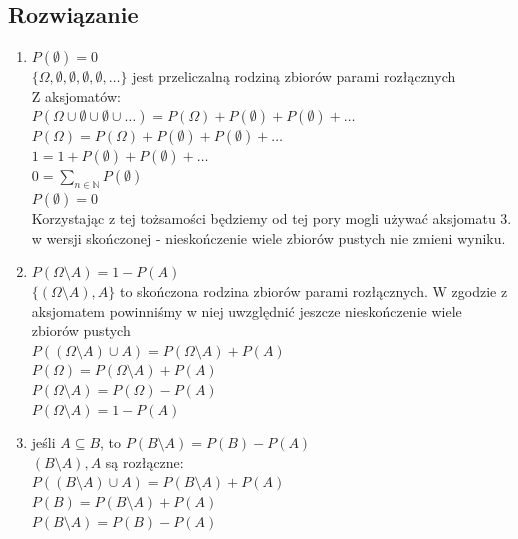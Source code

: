 \subsection*{Rozwiązanie}
\begin{enumerate}
	\item[(i)]
	      \(P(\emptyset) = 0\)\\
	      \(\{\Omega, \emptyset, \emptyset, \emptyset, \emptyset, \ldots\}\)
	      jest przeliczalną rodziną zbiorów parami rozłącznych\\
	      Z aksjomatów:\\
	      \(
	      P(\Omega \cup \emptyset \cup \emptyset \cup \ldots) =
	      P(\Omega) + P(\emptyset) + P(\emptyset) + \ldots
	      \)\\
	      \(
	      P(\Omega) =
	      P(\Omega) + P(\emptyset) + P(\emptyset) + \ldots
	      \)\\
	      \(
	      1 = 1 + P(\emptyset) + P(\emptyset) + \ldots
	      \)\\
	      \(
	      0 = \sum_{n\in\mathbb N} P(\emptyset)
	      \)\\
	      \(
	      P(\emptyset) = 0
	      \)\\
	      Korzystając z tej tożsamości będziemy od tej pory mogli używać
	      aksjomatu 3. w wersji skończonej - nieskończenie wiele zbiorów
	      pustych nie zmieni wyniku.

	\item[(ii)]
	      \(P(\Omega\setminus A) = 1 - P(A)\)\\
	      \(\{(\Omega\setminus A), A\}\) to skończona rodzina zbiorów parami rozłącznych.
	      W zgodzie z aksjomatem powinniśmy w niej uwzględnić jeszcze nieskończenie
	      wiele zbiorów pustych\\
	      \(P((\Omega\setminus A) \cup A) = P(\Omega\setminus A) + P(A)\)\\
	      \(P(\Omega) = P(\Omega\setminus A) + P(A)\)\\
	      \(P(\Omega\setminus A) = P(\Omega) - P(A)\)\\
	      \(P(\Omega\setminus A) = 1 - P(A)\)

	\item[(iii)]
	      jeśli \(A \subseteq B\), to \(P(B\setminus A) = P(B) - P(A)\)\\
	      \((B\setminus A), A\) są rozłączne:\\
	      \(P((B\setminus A)\cup A) = P(B\setminus A) + P(A)\)\\
	      \(P(B) = P(B\setminus A) + P(A)\)\\
	      \(P(B\setminus A) = P(B) - P(A)\)


\end{enumerate}
